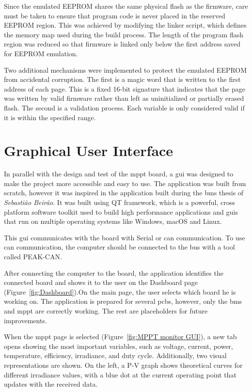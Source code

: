         Since the emulated EEPROM shares the same physical flash as the firmware, care must be taken to ensure that program code is never placed in the reserved EEPROM region. This was achieved by modifying the linker script, which defines the memory map used during the build process. The length of the program flash region was reduced so that firmware is linked only below the first address saved for EEPROM emulation.

        Two additional mechanisms were implemented to protect the emulated EEPROM from accidental corruption. The first is a magic word that is written to the first address of each page. This is a fixed 16-bit signature that indicates that the page was written by valid firmware rather than left as uninitialized or partially erased flash. The second is a validation process. Each variable is only considered valid if it is within the specified range.


    \section{Graphical User Interface}
        In parallel with the design and test of the \ac{mppt} board, a \ac{gui} was designed to make the project more accessible and easy to use. The application was built from scratch, however it was inspired in the application built during the \ac{bms} thesis of \textit{Sebastião Beirão}. It was built using QT framework, which is a powerful, cross platform software toolkit used to build high performance applications and \acp{gui} that run on multiple operating systems like Windows, macOS and Linux. 

        This \ac{gui} communicates with the board with Serial or \ac{can} communication. To use \ac{can} communication, the computer should be connected to the bus with a tool called PEAK-CAN.
        
        After connecting the computer to the board, the application identifies the connected board and shows it to the user on the Dashboard page (Figure~\ref{fig:Dashboard}).On the main page, the user selects which board he is working on. The application is prepared for several \acp{pcb}, however, only the \ac{bms} and \ac{mppt} are correctly working. The rest are placeholders for future improvements.

        When the \ac{mppt} page is selected (Figure~\ref{fig:MPPT monitor GUI}), a new tab opens showing the most important variables, such as voltage, current, power, temperature, efficiency, irradiance, and duty cycle. Additionally, two visual representations are shown. On the left, a P-V graph shows theoretical curves for different irradiance values, with a blue dot at the current operating point that updates with the received data.

